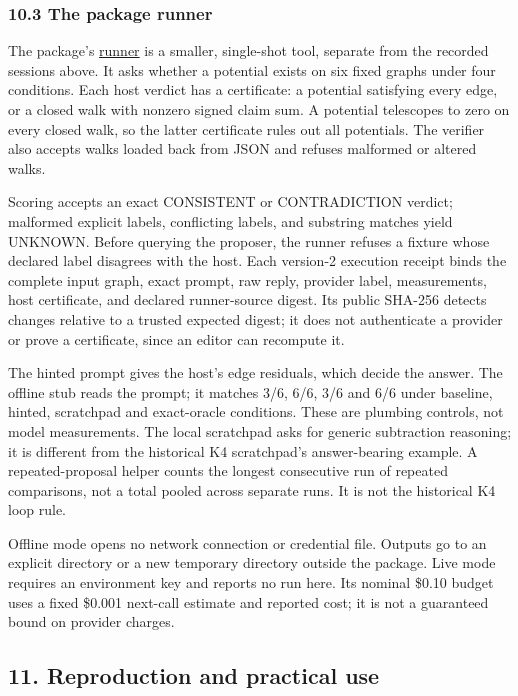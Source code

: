 \documentclass[
  11pt,
]{article}
\begin{document}
\hypertarget{the-package-runner}{%
\subsubsection{10.3 The package runner}\label{the-package-runner}}

The package's
\href{../../008_pfp_mssn_tower_challenges_and_retraction_benchmarks/code/retraction_benchmark_runner.py}{runner}
is a smaller, single-shot tool, separate from the recorded sessions
above. It asks whether a potential exists on six fixed graphs under four
conditions. Each host verdict has a certificate: a potential satisfying
every edge, or a closed walk with nonzero signed claim sum. A potential
telescopes to zero on every closed walk, so the latter certificate rules
out all potentials. The verifier also accepts walks loaded back from
JSON and refuses malformed or altered walks.

Scoring accepts an exact CONSISTENT or CONTRADICTION verdict; malformed
explicit labels, conflicting labels, and substring matches yield
UNKNOWN. Before querying the proposer, the runner refuses a fixture
whose declared label disagrees with the host. Each version-2 execution
receipt binds the complete input graph, exact prompt, raw reply,
provider label, measurements, host certificate, and declared
runner-source digest. Its public SHA-256 detects changes relative to a
trusted expected digest; it does not authenticate a provider or prove a
certificate, since an editor can recompute it.

The hinted prompt gives the host's edge residuals, which decide the
answer. The offline stub reads the prompt; it matches 3/6, 6/6, 3/6 and
6/6 under baseline, hinted, scratchpad and exact-oracle conditions.
These are plumbing controls, not model measurements. The local
scratchpad asks for generic subtraction reasoning; it is different from
the historical K4 scratchpad's answer-bearing example. A
repeated-proposal helper counts the longest consecutive run of repeated
comparisons, not a total pooled across separate runs. It is not the
historical K4 loop rule.

Offline mode opens no network connection or credential file. Outputs go
to an explicit directory or a new temporary directory outside the
package. Live mode requires an environment key and reports no run here.
Its nominal \$0.10 budget uses a fixed \$0.001 next-call estimate and
reported cost; it is not a guaranteed bound on provider charges.

\hypertarget{reproduction-and-practical-use}{%
\subsection{11. Reproduction and practical
use}\label{reproduction-and-practical-use}}
\end{document}
